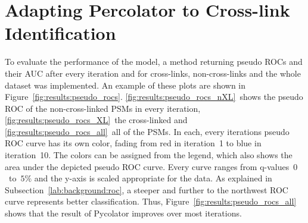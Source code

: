 \section{Adapting Percolator to Cross-link Identification}
\label{lab:results:pseudo_rocs}
To evaluate the performance of the model, a method returning pseudo ROCs and their AUC after every iteration and for cross-links, non-cross-links and the whole dataset was implemented. An example of these plots are shown in Figure~\ref{fig:results:pseudo_rocs}. \ref{fig:results:pseudo_rocs_nXL}~shows the pseudo ROC of the non-cross-linked PSMs in every iteration, \ref{fig:results:pseudo_rocs_XL}~the cross-linked and \ref{fig:results:pseudo_rocs_all}~all of the PSMs. In each, every iterations pseudo ROC curve has its own color, fading from red in iteration~1 to blue in iteration~10. The colors can be assigned from the legend, which also shows the area under the depicted pseudo ROC curve. Every curve ranges from q-values~$0$~to~$5\%$ and the y-axis is scaled appropriate for the data. As explained in Subsection~\ref{lab:background:roc}, a steeper and further to the northwest ROC curve represents better classification. Thus, Figure~\ref{fig:results:pseudo_rocs_all} shows that the result of Pycolator improves over most iterations.\\
\renewcommand{\baselinestretch}{0.9}
